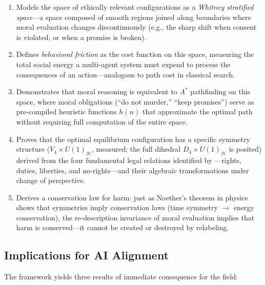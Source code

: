 \documentclass[12pt]{article}
\theoremstyle{definition}
\theoremstyle{remark}
\newcommand{\harm}{\mathcal{H}}
\begin{document}
\begin{enumerate}[label=(\roman*)]
    \item Models the space of ethically relevant configurations as a \emph{Whitney stratified space}---a space composed of smooth regions joined along boundaries where moral evaluation changes discontinuously (e.g., the sharp shift when consent is violated, or when a promise is broken).
    \item Defines \emph{behavioral friction} as the cost function on this space, measuring the total social energy a multi-agent system must expend to process the consequences of an action---analogous to path cost in classical search.
    \item Demonstrates that moral reasoning is equivalent to $A^*$ pathfinding on this space, where moral obligations (``do not murder,'' ``keep promises'') serve as pre-compiled heuristic functions $h(n)$ that approximate the optimal path without requiring full computation of the entire space.
    \item Proves that the optimal equilibrium configuration has a specific symmetry structure ($V_4 \times U(1)_\harm$, measured; the full dihedral $D_4 \times U(1)_\harm$ is posited) derived from the four fundamental legal relations identified by \citet{hohfeld1913}---rights, duties, liberties, and no-rights---and their algebraic transformations under change of perspective.
    \item Derives a conservation law for harm: just as Noether's theorem in physics shows that symmetries imply conservation laws (time symmetry $\to$ energy conservation), the re-description invariance of moral evaluation implies that harm is conserved---it cannot be created or destroyed by relabeling.
\end{enumerate}

\subsection{Implications for AI Alignment}

The framework yields three results of immediate consequence for the field:
\end{document}
